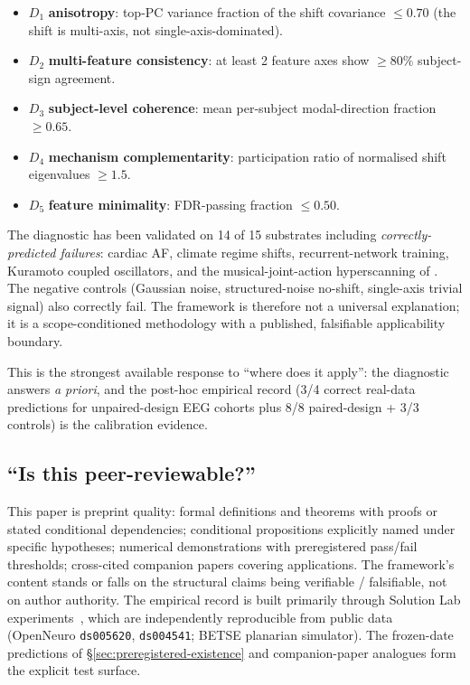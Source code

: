 \documentclass[11pt]{article}
\theoremstyle{plain}
\theoremstyle{definition}
\theoremstyle{remark}
\begin{document}
\begin{itemize}[leftmargin=2em]
\item $D_1$ \textbf{anisotropy}: top-PC variance fraction of the shift covariance $\leq 0.70$ (the shift is multi-axis, not single-axis-dominated).
\item $D_2$ \textbf{multi-feature consistency}: at least 2 feature axes show $\geq 80\%$ subject-sign agreement.
\item $D_3$ \textbf{subject-level coherence}: mean per-subject modal-direction fraction $\geq 0.65$.
\item $D_4$ \textbf{mechanism complementarity}: participation ratio of normalised shift eigenvalues $\geq 1.5$.
\item $D_5$ \textbf{feature minimality}: FDR-passing fraction $\leq 0.50$.
\end{itemize}

The diagnostic has been validated on 14 of 15 substrates including \emph{correctly-predicted failures}: cardiac AF, climate regime shifts, recurrent-network training, Kuramoto coupled oscillators, and the musical-joint-action hyperscanning of \citet{SolutionLab007}. The negative controls (Gaussian noise, structured-noise no-shift, single-axis trivial signal) also correctly fail. The framework is therefore not a universal explanation; it is a scope-conditioned methodology with a published, falsifiable applicability boundary.

This is the strongest available response to ``where does it apply'': the diagnostic answers \emph{a priori}, and the post-hoc empirical record (3/4 correct real-data predictions for unpaired-design EEG cohorts plus 8/8 paired-design + 3/3 controls) is the calibration evidence.

\subsection{``Is this peer-reviewable?''}

This paper is preprint quality: formal definitions and theorems with proofs or stated conditional dependencies; conditional propositions explicitly named under specific hypotheses; numerical demonstrations with preregistered pass/fail thresholds; cross-cited companion papers covering applications. The framework's content stands or falls on the structural claims being verifiable / falsifiable, not on author authority. The empirical record is built primarily through Solution Lab experiments~\citep{SolutionLab001, SolutionLab002}, which are independently reproducible from public data (OpenNeuro \texttt{ds005620}, \texttt{ds004541}; BETSE planarian simulator). The frozen-date predictions of \S\ref{sec:preregistered-existence} and companion-paper analogues form the explicit test surface.
\end{document}
